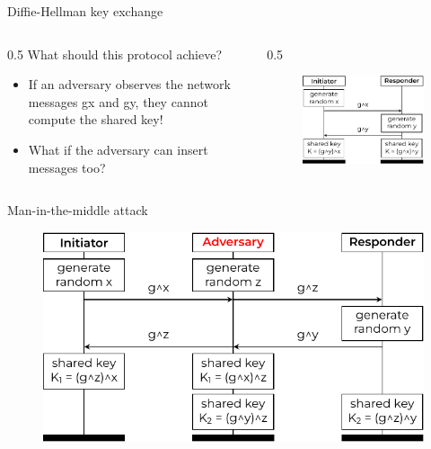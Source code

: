 \documentclass[11pt,aspectratio=169]{beamer}
\begin{document}
\begin{frame}[fragile]{Diffie-Hellman key exchange}
    \begin{columns}
        \begin{column}{0.5\hsize}
        What should this protocol achieve?
        \begin{itemize}
            \item If an adversary observes the network messages g\pow{}x and 
                  g\pow{}y, they cannot compute the shared key!
            \item What if the adversary can insert messages too?
        \end{itemize}
        \end{column}
        \begin{column}{0.5\hsize}
            \begin{figure}
                \includegraphics[width=\textwidth]{./figures/lecture_0/dh}
            \end{figure}
        \end{column}
    \end{columns}
\end{frame}

\begin{frame}[fragile]{Man-in-the-middle attack}
    \begin{figure}
        \includegraphics[width=.7\textwidth]{./figures/lecture_0/dh_mitm}
    \end{figure}
\end{frame}
\end{document}
